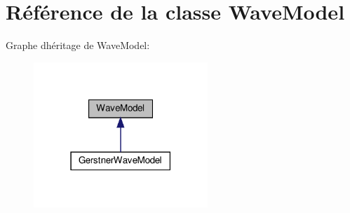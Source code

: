 \hypertarget{class_wave_model}{}\section{Référence de la classe Wave\+Model}
\label{class_wave_model}


Graphe d\textquotesingle{}héritage de Wave\+Model\+:
\nopagebreak
\begin{figure}[H]
\begin{center}
\leavevmode
\includegraphics[width=186pt]{class_wave_model__inherit__graph}
\end{center}
\end{figure}
